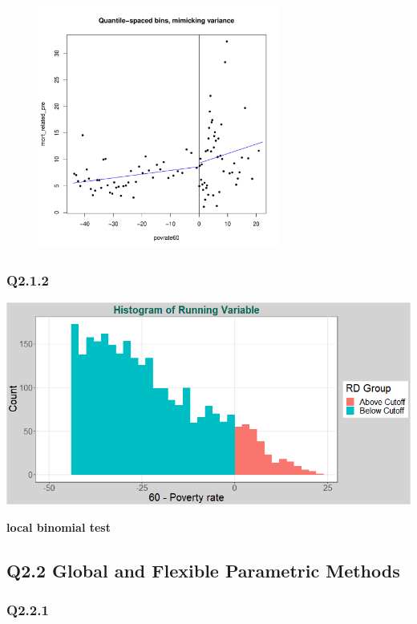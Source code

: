 \documentclass[11pt]{article}
\begin{document}
\begin{figure}[H]
{		\includegraphics[width=80mm]{plot_211iib.pdf}
	}
	
\end{figure}

\subsubsection{Q2.1.2}
\begin{center}
	\includegraphics[width=.8\linewidth]{plot_212i.png}
	
\end{center}
\begin{center}
	\centering
	\textbf{local binomial test}\par\medskip
	\scalebox{0.85}{
		
	}
\end{center}


\subsection{Q2.2 Global and Flexible Parametric Methods}
\subsubsection{Q2.2.1}
\end{document}
